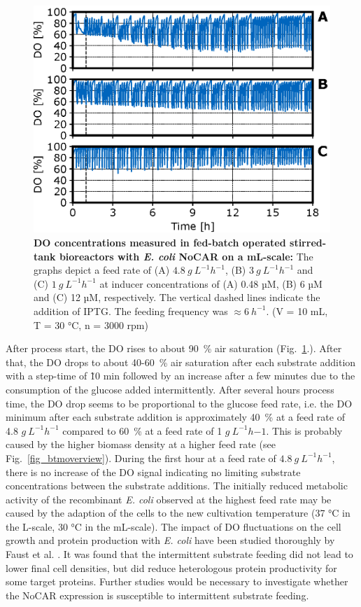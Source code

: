\documentclass[sn-standardnature]{sn-jnl}%
\theoremstyle{thmstyleone}%
\theoremstyle{thmstyletwo}%
\theoremstyle{thmstylethree}%
\begin{document}
\begin{figure}[H]
    \centering
    \includegraphics[width=1.0\textwidth]{figures/Fig3.eps}
    \caption{
        \textbf{DO concentrations measured in fed-batch operated stirred-tank bioreactors with \textit{E. coli} NoCAR on a mL-scale:}
        The graphs depict a feed rate of (A) $4.8\ g\ L^{-1} h^{-1}$, (B) $3\ g\ L^{-1} h^{-1}$ and (C) $1\ g\ L^{-1} h^{-1}$ at inducer concentrations of (A) 0.48 µM, (B) 6 µM and (C) 12 µM, respectively.
        The vertical dashed lines indicate the addition of IPTG.
        The feeding frequency was $\approx 6\ h^{-1}$.
        (V = 10 mL, T = 30 °C, n = 3000 rpm)
    }
    \label{fig_o2overview}
\end{figure}


After process start, the DO rises to about 90~\% air saturation (Fig.~\ref{fig_o2overview}.).
After that, the DO drops to about 40-60~\% air saturation after each substrate addition with a step-time of \~10 min followed by an increase after a few minutes due to the consumption of the glucose added intermittently.
After several hours process time, the DO drop seems to be proportional to the glucose feed rate, i.e. the DO minimum after each substrate addition is approximately 40~\% at a feed rate of 4.8 $ g\ L^{-1} h^{-1}$ compared to 60~\% at a feed rate of 1 $ g\ L^{-1} h{-1}$.
This is probably caused by the higher biomass density at a higher feed rate (see Fig.~\ref{fig_btmoverview}).
During the first hour at a feed rate of $4.8\ g\ L^{-1} h^{-1}$, there is no increase of the DO signal indicating no limiting substrate concentrations between the substrate additions.
The initially reduced metabolic activity of the recombinant \textit{E. coli} observed at the highest feed rate may be caused by the adaption of the cells to the new cultivation temperature (37 °C in the L-scale, 30 °C in the mL-scale). 
The impact of DO fluctuations on the cell growth and protein production with \textit{E. coli}  have been studied thoroughly by Faust et al. \cite{faust2014feeding}. It was found that the intermittent substrate feeding did not lead to lower final cell densities, but did reduce heterologous protein productivity for some target proteins.
Further studies would be necessary to investigate whether the NoCAR expression is susceptible to intermittent substrate feeding. 
\end{document}
